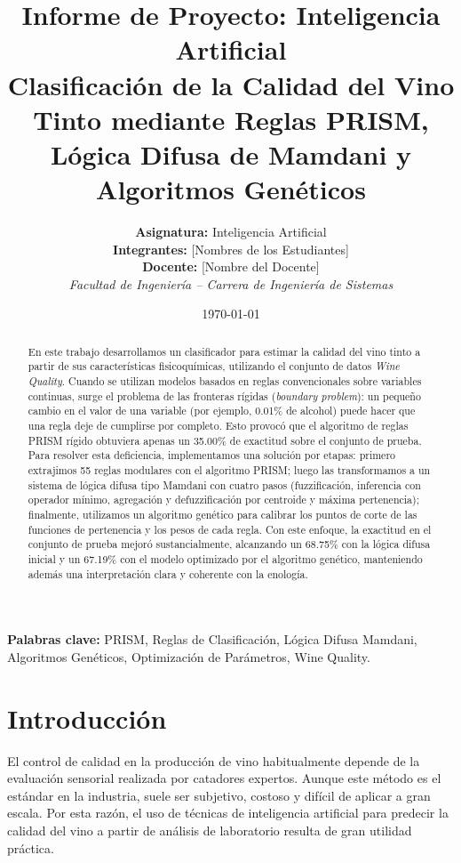 \documentclass[11pt,a4paper]{article}
\title{
    \vspace{-1.5cm}
    \textbf{Informe de Proyecto: Inteligencia Artificial} \\[0.3cm]
    \Large \textbf{Clasificación de la Calidad del Vino Tinto mediante Reglas PRISM, Lógica Difusa de Mamdani y Algoritmos Genéticos}
}
\author{
    \textbf{Asignatura:} Inteligencia Artificial \\[0.1cm]
    \textbf{Integrantes:} [Nombres de los Estudiantes] \\[0.1cm]
    \textbf{Docente:} [Nombre del Docente] \\[0.1cm]
    \textit{Facultad de Ingeniería -- Carrera de Ingeniería de Sistemas}
}
\date{\today}
\begin{document}
\maketitle

\begin{abstract}
En este trabajo desarrollamos un clasificador para estimar la calidad del vino tinto a partir de sus características fisicoquímicas, utilizando el conjunto de datos \textit{Wine Quality}. Cuando se utilizan modelos basados en reglas convencionales sobre variables continuas, surge el problema de las fronteras rígidas (\textit{boundary problem}): un pequeño cambio en el valor de una variable (por ejemplo, 0.01\% de alcohol) puede hacer que una regla deje de cumplirse por completo. Esto provocó que el algoritmo de reglas PRISM rígido obtuviera apenas un 35.00\% de exactitud sobre el conjunto de prueba. Para resolver esta deficiencia, implementamos una solución por etapas: primero extrajimos 55 reglas modulares con el algoritmo PRISM; luego las transformamos a un sistema de lógica difusa tipo Mamdani con cuatro pasos (fuzzificación, inferencia con operador mínimo, agregación y defuzzificación por centroide y máxima pertenencia); finalmente, utilizamos un algoritmo genético para calibrar los puntos de corte de las funciones de pertenencia y los pesos de cada regla. Con este enfoque, la exactitud en el conjunto de prueba mejoró sustancialmente, alcanzando un 68.75\% con la lógica difusa inicial y un 67.19\% con el modelo optimizado por el algoritmo genético, manteniendo además una interpretación clara y coherente con la enología.
\end{abstract}

\vspace{0.3cm}
\noindent\textbf{Palabras clave:} PRISM, Reglas de Clasificación, Lógica Difusa Mamdani, Algoritmos Genéticos, Optimización de Parámetros, Wine Quality.

\vspace{0.4cm}

\section{Introducción}

El control de calidad en la producción de vino habitualmente depende de la evaluación sensorial realizada por catadores expertos. Aunque este método es el estándar en la industria, suele ser subjetivo, costoso y difícil de aplicar a gran escala. Por esta razón, el uso de técnicas de inteligencia artificial para predecir la calidad del vino a partir de análisis de laboratorio resulta de gran utilidad práctica.
\end{document}
